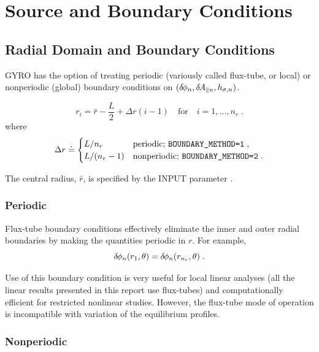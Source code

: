 \chapter{Source and Boundary Conditions}\label{chap.source}

\section{Radial Domain and Boundary Conditions}\label{sec.boundary}

GYRO has the option of treating periodic (variously called flux-tube, 
or local) or nonperiodic (global) boundary conditions on 
$(\delta \hskip -1pt \phi_n,\delta \hskip -1pt A_{\parallel n},h_{\sigma,n})$.

\begin{equation}
r_i = \bar{r} - \frac{L}{2} + \Delta r (i-1) 
\quad\text{for}\quad i = 1,\ldots,n_r \; .
\end{equation}
where 
%
\begin{equation}
\Delta r \doteq 
\begin{cases}
 \displaystyle L/n_r & \text{periodic; {\tt BOUNDARY\_METHOD=1}} \; ,\\
 \displaystyle L/(n_r-1) & \text{nonperiodic; {\tt BOUNDARY\_METHOD=2}} \; .
\end{cases} 
\end{equation}

\noindent
The central radius, $\bar{r}$, is specified by the INPUT 
parameter .

\subsection{Periodic}

Flux-tube boundary conditions effectively eliminate the inner 
and outer radial boundaries by making the quantities periodic in $r$.  
For example, 
%
\begin{equation}
\delta \hskip -1pt \phi_n(r_1,\theta) = \delta \hskip -1pt \phi_n(r_{n_r},\theta) \; .
\end{equation}

\noindent
Use of this boundary condition is very useful for 
local linear analyses (all the linear results presented 
in this report use flux-tubes) and computationally 
efficient for restricted nonlinear studies.  However, 
the flux-tube mode of operation is incompatible with 
variation of the equilibrium profiles.

\subsection{Nonperiodic}

